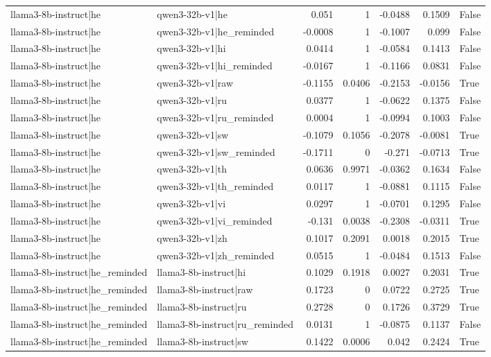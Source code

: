 \begin{table}
\begin{tabular}{l l r r r r l}
llama3-8b-instruct|he & qwen3-32b-v1|he & 0.051 & 1 & -0.0488 & 0.1509 & False \\
llama3-8b-instruct|he & qwen3-32b-v1|he_reminded & -0.0008 & 1 & -0.1007 & 0.099 & False \\
llama3-8b-instruct|he & qwen3-32b-v1|hi & 0.0414 & 1 & -0.0584 & 0.1413 & False \\
llama3-8b-instruct|he & qwen3-32b-v1|hi_reminded & -0.0167 & 1 & -0.1166 & 0.0831 & False \\
llama3-8b-instruct|he & qwen3-32b-v1|raw & -0.1155 & 0.0406 & -0.2153 & -0.0156 & True \\
llama3-8b-instruct|he & qwen3-32b-v1|ru & 0.0377 & 1 & -0.0622 & 0.1375 & False \\
llama3-8b-instruct|he & qwen3-32b-v1|ru_reminded & 0.0004 & 1 & -0.0994 & 0.1003 & False \\
llama3-8b-instruct|he & qwen3-32b-v1|sw & -0.1079 & 0.1056 & -0.2078 & -0.0081 & True \\
llama3-8b-instruct|he & qwen3-32b-v1|sw_reminded & -0.1711 & 0 & -0.271 & -0.0713 & True \\
llama3-8b-instruct|he & qwen3-32b-v1|th & 0.0636 & 0.9971 & -0.0362 & 0.1634 & False \\
llama3-8b-instruct|he & qwen3-32b-v1|th_reminded & 0.0117 & 1 & -0.0881 & 0.1115 & False \\
llama3-8b-instruct|he & qwen3-32b-v1|vi & 0.0297 & 1 & -0.0701 & 0.1295 & False \\
llama3-8b-instruct|he & qwen3-32b-v1|vi_reminded & -0.131 & 0.0038 & -0.2308 & -0.0311 & True \\
llama3-8b-instruct|he & qwen3-32b-v1|zh & 0.1017 & 0.2091 & 0.0018 & 0.2015 & True \\
llama3-8b-instruct|he & qwen3-32b-v1|zh_reminded & 0.0515 & 1 & -0.0484 & 0.1513 & False \\
llama3-8b-instruct|he_reminded & llama3-8b-instruct|hi & 0.1029 & 0.1918 & 0.0027 & 0.2031 & True \\
llama3-8b-instruct|he_reminded & llama3-8b-instruct|raw & 0.1723 & 0 & 0.0722 & 0.2725 & True \\
llama3-8b-instruct|he_reminded & llama3-8b-instruct|ru & 0.2728 & 0 & 0.1726 & 0.3729 & True \\
llama3-8b-instruct|he_reminded & llama3-8b-instruct|ru_reminded & 0.0131 & 1 & -0.0875 & 0.1137 & False \\
llama3-8b-instruct|he_reminded & llama3-8b-instruct|sw & 0.1422 & 0.0006 & 0.042 & 0.2424 & True \\

\end{tabular}
\end{table}
